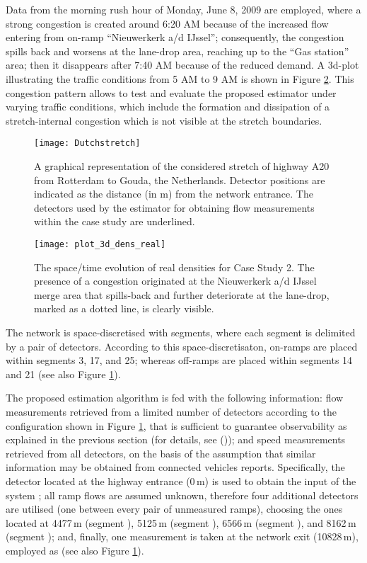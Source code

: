 \documentclass[titlepage,oneside,fleqn,12pt]{article}
\newcommand{\trbcite}[1]{\citeauthor{#1} ({\it \citenum{#1}})}
\begin{document}
Data from the morning rush hour of Monday, June 8, 2009 are employed, where a strong congestion is created around 6:20 AM because of the increased flow entering from on-ramp ``Nieuwerkerk a/d IJssel''; consequently, the congestion spills back and worsens at the lane-drop area, reaching up to the ``Gas station'' area; then it disappears after 7:40 AM because of the reduced demand. A 3d-plot illustrating the traffic conditions from 5 AM to 9 AM is shown in Figure \ref{fig:3d-dens_real}. This congestion pattern allows to test and evaluate the proposed estimator under varying traffic conditions, which include the formation and dissipation of a stretch-internal congestion which is not visible at the stretch boundaries.

\begin{figure}
\begin{center}
	\texttt{[image: Dutchstretch]}
	\caption{A graphical representation of the considered stretch of highway A20 from Rotterdam to Gouda, the Netherlands. Detector positions are indicated as the distance (in m) from the network entrance. The detectors used by the estimator for obtaining flow measurements within the case study are underlined.} 
	\label{fig:dutchStretch}
\end{center}
\end{figure}

\begin{figure}
\begin{center}
	\texttt{[image: plot\_3d\_dens\_real]}
	\caption{The space/time evolution of real densities for Case Study 2. The presence of a congestion originated at the Nieuwerkerk a/d IJssel merge area that spills-back and further deteriorate at the lane-drop, marked as a dotted line, is clearly visible.} 
	\label{fig:3d-dens_real}
\end{center}
\end{figure}

The network is space-discretised with  segments, where each segment is delimited by a pair of detectors. According to this space-discretisaton, on-ramps are placed within segments 3, 17, and 25; whereas off-ramps are placed within segments 14 and 21 (see also Figure \ref{fig:dutchStretch}).

The proposed estimation algorithm is fed with the following information: flow measurements retrieved from a limited number of detectors according to the configuration shown in Figure \ref{fig:dutchStretch}, that is sufficient to guarantee observability as explained in the previous section (for details, see \trbcite{Bekiaris2015}); and speed measurements retrieved from all detectors, on the basis of the assumption that similar information may be obtained from connected vehicles reports. Specifically, the detector located at the highway entrance (0\,m) is used to obtain the input of the system ; all ramp flows are assumed unknown, therefore four additional detectors are utilised (one between every pair of unmeasured ramps), choosing the ones located at 4477\,m (segment ), 5125\,m (segment ), 6566\,m (segment ), and 8162\,m (segment ); and, finally, one measurement is taken at the network exit (10828\,m), employed as  (see also Figure \ref{fig:dutchStretch}).
\end{document}
